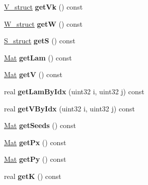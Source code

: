 \begin{DoxyCompactItemize}
\item 
\mbox{\label{classvd_a090bebdbbff36888934c870daf3dcb36}} 
\mbox{\hyperlink{structV__struct}{V\+\_\+struct}} {\bfseries get\+Vk} () const
\item 
\mbox{\label{classvd_ab4d0d9ea76cedf1a6825b62c9ec2d118}} 
\mbox{\hyperlink{structW__struct}{W\+\_\+struct}} {\bfseries getW} () const
\item 
\mbox{\label{classvd_a6b1b73738e720c8ffa2351841c44eabb}} 
\mbox{\hyperlink{structS__struct}{S\+\_\+struct}} {\bfseries getS} () const
\item 
\mbox{\label{classvd_a37c4ab12669eb276fe7fa4a610310345}} 
\mbox{\hyperlink{aux_8h_aa1fe91b8cd36c618282eb0d548690c4c}{Mat}} {\bfseries get\+Lam} () const
\item 
\mbox{\label{classvd_aad4ea5c045b8380f83b0490af2fee0fa}} 
\mbox{\hyperlink{aux_8h_aa1fe91b8cd36c618282eb0d548690c4c}{Mat}} {\bfseries getV} () const
\item 
\mbox{\label{classvd_a5c26b069f893aa82eeaf53ff608eda1f}} 
real {\bfseries get\+Lam\+By\+Idx} (uint32 i, uint32 j) const
\item 
\mbox{\label{classvd_a640ed20e4618abd409e180a707eea3b1}} 
real {\bfseries get\+V\+By\+Idx} (uint32 i, uint32 j) const
\item 
\mbox{\label{classvd_a82f353c594c3c6b24f6077398f059d3a}} 
\mbox{\hyperlink{aux_8h_aa1fe91b8cd36c618282eb0d548690c4c}{Mat}} {\bfseries get\+Seeds} () const
\item 
\mbox{\label{classvd_aeba6d318016c8f8b9537ce4c0314f8cd}} 
\mbox{\hyperlink{aux_8h_aa1fe91b8cd36c618282eb0d548690c4c}{Mat}} {\bfseries get\+Px} () const
\item 
\mbox{\label{classvd_a9738711704b1d03cdbe027b1976cb0c6}} 
\mbox{\hyperlink{aux_8h_aa1fe91b8cd36c618282eb0d548690c4c}{Mat}} {\bfseries get\+Py} () const
\item 
\mbox{\label{classvd_a624f53ae4a7012f267111359e9245f81}} 
real {\bfseries getK} () const

\end{DoxyCompactItemize}
